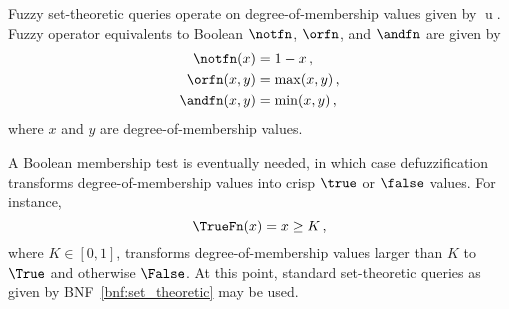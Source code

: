 \documentclass[ ../main.tex]{subfiles}
\begin{document}
Fuzzy set-theoretic queries operate on degree-of-membership values given by $\operatorname{u}$. Fuzzy operator equivalents to Boolean $\notfn$, $\orfn$, and $\andfn$ are given by
\begin{align}
    \notfn(x) &= 1 - x\,,\\
    \orfn(x, y) &= \max(x, y)\,,\\
    \andfn(x, y) &= \min(x, y)\,,
\end{align}
where $x$ and $y$ are degree-of-membership values.

A Boolean membership test is eventually needed, in which case defuzzification transforms degree-of-membership values into crisp $\true$ or $\false$ values. For instance,
\begin{equation}
    \TrueFn(x) = x \geq K\,,
\end{equation}
where $K \in [0,1]$, transforms degree-of-membership values larger than $K$ to $\True$ and otherwise $\False$. At this point, standard set-theoretic queries as given by BNF~\ref{bnf:set_theoretic} may be used.
\end{document}
